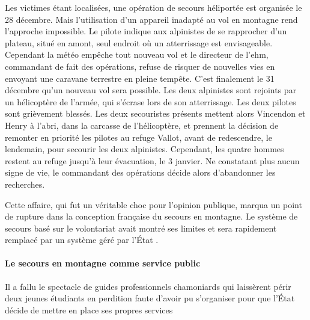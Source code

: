 Les victimes étant localisées, une opération de secours héliportée est
organisée le 28 décembre. Mais l'utilisation d'un appareil inadapté au
vol en montagne rend l'approche impossible. Le pilote indique aux
alpinistes de se rapprocher d'un plateau, situé en amont, seul endroit
où un atterrissage est envisageable. Cependant la météo empêche tout
nouveau vol et le directeur de l'\ac{ehm}, commandant de fait des
opérations, refuse de risquer de nouvelles vies en envoyant une
caravane terrestre en pleine tempête. C'est finalement le 31 décembre
qu'un nouveau vol sera possible. Les deux alpinistes sont rejoints par
un hélicoptère de l'armée, qui s'écrase lors de son atterrissage. Les
deux pilotes sont grièvement blessés. Les deux secouristes présents
mettent alors Vincendon et Henry à l'abri, dans la carcasse de
l'hélicoptère, et prennent la décision de remonter en priorité les
pilotes au refuge Vallot, avant de redescendre, le lendemain, pour
secourir les deux alpinistes. Cependant, les quatre hommes restent au
refuge jusqu’à leur évacuation, le 3 janvier. Ne constatant plus aucun
signe de vie, le commandant des opérations décide alors d'abandonner
les recherches.

Cette affaire, qui fut un véritable choc pour l’opinion publique,
marqua un point de rupture dans la conception française du secours en
montagne. Le système de secours basé sur le volontariat avait montré
ses limites et sera rapidement remplacé par un système géré par l'État
\autocite{Ballu1997}.

\paragraph{Le secours en montagne comme service public}
\label{par:1-1-1-1-2}


\begin{displayquote}
  \og Il a fallu le spectacle de guides professionnels chamoniards
  qui laissèrent périr deux jeunes étudiants en perdition faute
  d'avoir pu s'organiser pour que l'État décide de mettre en place ses
  propres services \textelp{}\fg{} \autocite{Descamps2018}
\end{displayquote}

